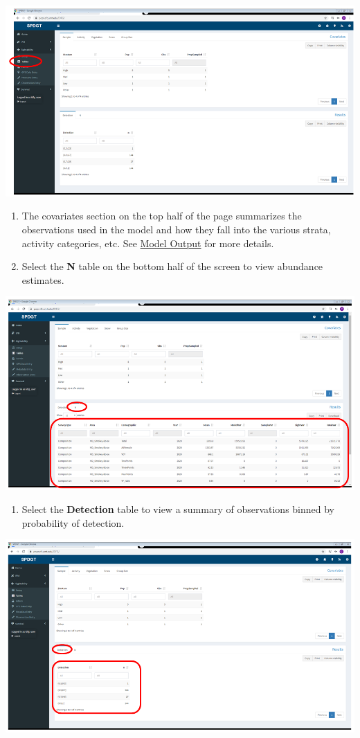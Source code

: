 \documentclass[
]{book}
\providecommand{\tightlist}{%
  \setlength{\itemsep}{0pt}\setlength{\parskip}{0pt}}
\begin{document}
\includegraphics{./www/sight_07.PNG}

\begin{enumerate}
\def\labelenumi{\arabic{enumi}.}
\setcounter{enumi}{9}
\item
  The covariates section on the top half of the page summarizes the observations used in the model and how they fall into the various strata, activity categories, etc. See \protect\hyperlink{sight-output}{Model Output} for more details.
\item
  Select the \textbf{N} table on the bottom half of the screen to view abundance estimates.
\end{enumerate}

\includegraphics{./www/sight_08.PNG}

\begin{enumerate}
\def\labelenumi{\arabic{enumi}.}
\setcounter{enumi}{11}
\tightlist
\item
  Select the \textbf{Detection} table to view a summary of observations binned by probability of detection.
\end{enumerate}

\includegraphics{./www/sight_09.PNG}
\end{document}
